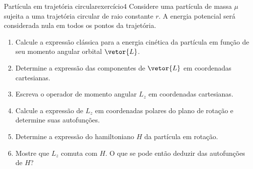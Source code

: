 \begin{exercício}{Partícula em trajetória circular}{exercício4}
    Considere uma partícula de massa \(\mu\) sujeita a uma trajetória circular de raio constante \(r\). A energia potencial será considerada nula em todos os pontos da trajetória.
    \begin{enumerate}[label=(\alph*)]
        \item Calcule a expressão clássica para a energia cinética da partícula em função de seu momento angular orbital \(\vetor{L}\).
        \item Determine a expressão das componentes de \(\vetor{L}\) em coordenadas cartesianas.
        \item Escreva o operador de momento angular \(L_z\) em coordenadas cartesianas.
        \item Calcule a expressão de \(L_z\) em coordenadas polares do plano de rotação e determine suas autofunções.
        \item Determine a expressão do hamiltoniano \(H\) da partícula em rotação.
        \item Mostre que \(L_z\) comuta com \(H\). O que se pode então deduzir das autofunções de \(H\)?
    \end{enumerate}
\end{exercício}

